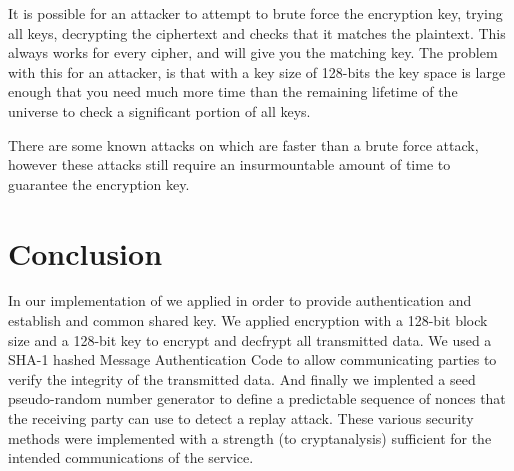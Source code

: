 \documentclass[a4paper,11pt]{article}
\begin{document}
It is possible for an attacker to attempt to brute force the encryption key, 
trying all keys, decrypting the ciphertext and checks that it matches the 
plaintext. This always works for every cipher, and will give you the matching 
key. The problem with this for an attacker, is that with a key size of 128-bits 
the key space is large enough that you need much more time than the remaining 
lifetime of the universe to check a significant portion of all keys.

There are some known attacks on  which are faster than a brute
force attack, however these attacks still require an insurmountable amount of 
time to guarantee the encryption key.

\section{Conclusion}
In our implementation of \packageName{} we applied  in order to provide authentication and establish and common shared 
key. We applied  encryption with a 128-bit block size and a
128-bit key to encrypt and decfrypt all transmitted data. We used a SHA-1 
hashed Message Authentication Code to allow communicating parties to verify the
integrity of the transmitted data. And finally we implented a seed pseudo-random
number generator to define a predictable sequence of nonces that the receiving 
party can use to detect a replay attack. These various security methods were 
implemented with a strength (to cryptanalysis) sufficient for the intended 
communications of the \serviceName{} service.
\end{document}
